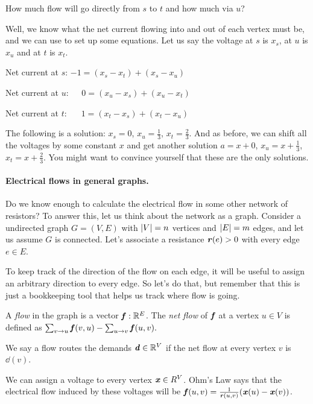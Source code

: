 How much flow will go directly from $s$ to $t$ and how much via $u$?

Well, we know what the net current flowing into and out of each vertex
must be, and we can use to set up some equations.
Let us say the voltage at $s$ is $x_s$, at $u$ is $x_u$ and at $t$ is $x_t$.
\begin{tight_itemize}
\item Net current at $s$:   $-1 = (x_s-x_t) + (x_s-x_u)$
\item  Net current at $u$:   $\phantom{-}0 = (x_u-x_s) + (x_u-x_t)$
\item Net current at  $t$:\,   $\phantom{-}1 = (x_t-x_s)+(x_t-x_u)$
\end{tight_itemize}
The following is a solution: $x_s = 0$, $x_u = \frac{1}{3}$, $x_t
= \frac{2}{3}$.
And as before, we can shift all the voltages by some constant $x$ and
get another solution $a = x+0$, $x_u = x+\frac{1}{3}$, $x_t
= x+\frac{2}{3}$. You might want to convince yourself that these are the only solutions.

\paragraph{Electrical flows in general graphs.}
Do we know enough to calculate the electrical flow in some other
network of resistors?
To answer this, let us think about the network
as a graph.
Consider a undirected graph $G = (V,E)$ with $\left|V \right| = n$ vertices and
$\left|E \right| = m$ edges, and let us assume $G$ is connected.
Let's associate a resistance
$\boldsymbol{\mathit{r}}(e) > 0$ with every edge $e \in E$.

To keep track of the direction of the flow on each edge, it will be
useful to assign an arbitrary direction to every edge. So let's do
that, but remember that this is just a bookkeeping tool that helps
us track where flow is going.

A \emph{flow} in the graph is a vector $\boldsymbol{\mathit{f}}: \mathbb{R}^E$.
%
The \emph{net flow} of $\boldsymbol{\mathit{f}}$ at a vertex $u \in V$ is defined as
$\sum_{v \to u} \boldsymbol{\mathit{f}}(v,u) - \sum_{u  \to v} \boldsymbol{\mathit{f}}(u,v).$

We say a flow routes the demands $\boldsymbol{\mathit{d}} \in \mathbb{R}^V$ if the net flow at
every vertex $v$ is $\dd(v)$.

We can assign a voltage to every vertex $\boldsymbol{\mathit{x}} \in R^V$.
Ohm's Law says that the electrical flow induced by these voltages will
be $\boldsymbol{\mathit{f}}(u,v) = \frac{1}{\boldsymbol{\mathit{r}}(u,v)} (\boldsymbol{\mathit{x}}(u) - \boldsymbol{\mathit{x}}(v))$.

